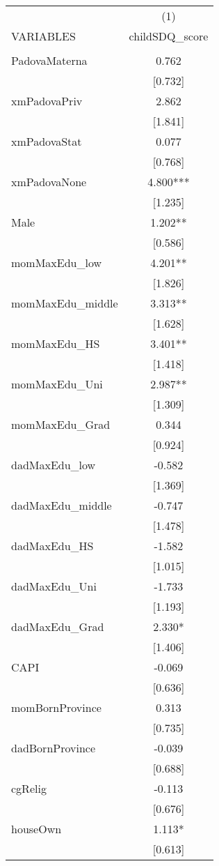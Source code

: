 \documentclass[]{article}
\begin{document}
\begin{tabular}{lc} \hline
 & (1) \\
VARIABLES & childSDQ\_score \\ \hline
 &  \\
PadovaMaterna & 0.762 \\
 & [0.732] \\
xmPadovaPriv & 2.862 \\
 & [1.841] \\
xmPadovaStat & 0.077 \\
 & [0.768] \\
xmPadovaNone & 4.800*** \\
 & [1.235] \\
Male & 1.202** \\
 & [0.586] \\
momMaxEdu\_low & 4.201** \\
 & [1.826] \\
momMaxEdu\_middle & 3.313** \\
 & [1.628] \\
momMaxEdu\_HS & 3.401** \\
 & [1.418] \\
momMaxEdu\_Uni & 2.987** \\
 & [1.309] \\
momMaxEdu\_Grad & 0.344 \\
 & [0.924] \\
dadMaxEdu\_low & -0.582 \\
 & [1.369] \\
dadMaxEdu\_middle & -0.747 \\
 & [1.478] \\
dadMaxEdu\_HS & -1.582 \\
 & [1.015] \\
dadMaxEdu\_Uni & -1.733 \\
 & [1.193] \\
dadMaxEdu\_Grad & 2.330* \\
 & [1.406] \\
CAPI & -0.069 \\
 & [0.636] \\
momBornProvince & 0.313 \\
 & [0.735] \\
dadBornProvince & -0.039 \\
 & [0.688] \\
cgRelig & -0.113 \\
 & [0.676] \\
houseOwn & 1.113* \\
 & [0.613] \\

\end{tabular}
\end{document}
